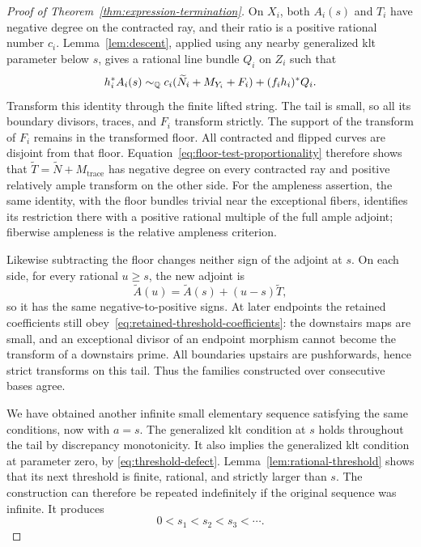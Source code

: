 \begin{proof}[Proof of Theorem~\ref{thm:expression-termination}]
On $X_i$, both $A_i(s)$ and $T_i$ have negative degree on the contracted
ray, and their ratio is a positive rational number $c_i$.
Lemma~\ref{lem:descent}, applied using any nearby generalized
klt parameter below $s$, gives a rational line bundle $Q_i$ on $Z_i$
such that
\begin{equation}\label{eq:floor-test-proportionality}
 h_i^*A_i(s)\sim_{\mathbb Q}
 c_i(\widetilde N_i+M_{Y_i}+F_i)+(f_i h_i)^*Q_i.
\end{equation}
Transform this identity through the finite lifted string.  The tail is
small, so all its boundary divisors, traces, and $F_i$ transform strictly.
The support of the transform of $F_i$ remains in the transformed floor.
All contracted and flipped curves are disjoint from that floor.
Equation~\eqref{eq:floor-test-proportionality} therefore shows that
\(\widetilde T=\widetilde N+M_{\mathrm{trace}}\) has negative degree on
every contracted ray and positive relatively ample transform on the
other side.  For the ampleness assertion, the same identity, with the
floor bundles trivial near the exceptional fibers, identifies its
restriction there with a positive rational multiple of the full ample
adjoint; fiberwise ampleness is the relative ampleness criterion.

Likewise subtracting the floor changes neither sign of the adjoint at
$s$.  On each side, for every rational $u\geq s$, the new adjoint is
\[
 \widetilde A(u)=\widetilde A(s)+(u-s)\widetilde T,
\]
so it has the same negative-to-positive signs.  At later endpoints the
retained coefficients still obey~\eqref{eq:retained-threshold-coefficients}:
the downstairs maps are small, and an exceptional divisor of an endpoint
morphism cannot become the transform of a downstairs prime.  All
boundaries upstairs are pushforwards, hence strict transforms on this
tail.  Thus the families constructed over consecutive bases agree.

We have obtained another infinite small elementary sequence satisfying
the same conditions, now with $a=s$.  The generalized klt condition at
$s$ holds throughout the tail by discrepancy monotonicity.  It also
implies the generalized klt condition at parameter zero, by
\eqref{eq:threshold-defect}.  Lemma~\ref{lem:rational-threshold} shows
that its next threshold is finite, rational, and strictly larger than
$s$.  The construction can therefore be repeated indefinitely if the
original sequence was infinite.  It produces
\begin{equation}\label{eq:increasing-thresholds}
 0<s_1<s_2<s_3<\cdots.
\end{equation}


\end{proof}
